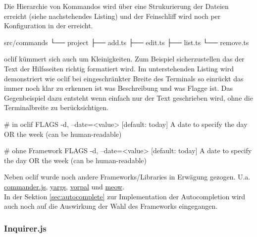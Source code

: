 \documentclass[oneside,bibliography=totocnumbered,BCOR=5mm]{scrbook}
\newenvironment{code}{\captionsetup{type=listing, skip=0pt}}{}
\begin{document}
Die Hierarchie von Kommandos wird über eine Strukurierung der Dateien erreicht (siehe nachstehendes Listing) und der Feinschliff wird noch per Konfiguration in der  erreicht.

\begin{code}
  \begin{shellcode}
 src/commands
 └── project
     ├── add.ts
     ├── edit.ts
     ├── list.ts
     └── remove.ts
  \end{shellcode}
  \medskip
\end{code}

oclif kümmert sich auch um Kleinigkeiten. Zum Beispiel sicherzustellen das der
Text der Hilfsseiten richtig formatiert wird. Im unterstehenden Listing wird
demonstriert wie oclif bei eingeschränkter Breite des Terminals so einrückt
das immer noch klar zu erkennen ist was Beschreibung und was Flagge ist. Das
Gegenbeispiel dazu entsteht wenn einfach nur der Text geschrieben wird, ohne die
Terminalbreite zu berücksichtigen.

\begin{code}
  \begin{shellcode}
# in oclif
FLAGS
  -d, --date=<value>  [default: today] A date to specify the day OR
                      the week (can be human-readable)

# ohne Framework
FLAGS
  -d, --date=<value>  [default: today] A date to specify the day OR
the week (can be human-readable)
  \end{shellcode}
  \label{lst:oclif-umbruch}
  \medskip
\end{code}

\medskip

Neben oclif wurde noch andere Frameworks/Libraries in Erwägung gezogen. U.a.
\href{https://github.com/tj/commander.js}{commander.js},
\href{https://github.com/yargs/yargs}{yargs},
\href{https://github.com/dthree/vorpal}{vorpal} und
\href{https://github.com/sindresorhus/meow}{meow}.
\\
In der Sektion \ref{sec:autocomplete} zur Implementation der Autocompletion wird
auch noch auf die Auswirkung der Wahl des Frameworks eingegangen.

\subsubsection{Inquirer.js}
\end{document}

